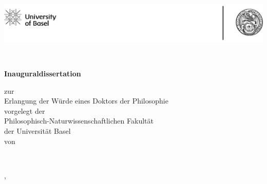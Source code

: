 
\thispagestyle{empty}
\begin{otherlanguage}{ngerman}

\begin{center}

\-\\ %
\vspace*{-2cm}
\begin{center}
\hspace*{-1cm}%
\iflogo
\includegraphics[width=\textwidth+2cm\relax]{title}%
\else
\vspace{1cm}
\fi
\hspace*{-1cm}%
\end{center}

\-\\ %
\bigskip \bigskip 

\LARGE{\textsc{\thesistitle}}

\bigskip \bigskip \bigskip \bigskip \bigskip

\normalsize{
\textbf{Inauguraldissertation} \\

\bigskip \bigskip \bigskip

zur \\
\medskip
Erlangung der Würde eines Doktors der Philosophie \\
\medskip
vorgelegt der \\
\medskip
Philosophisch-Naturwissenschaftlichen Fakultät \\
\medskip
der Universität Basel\\

\bigskip \bigskip \bigskip
von\\
\bigskip \bigskip \bigskip

\thesisauthor\\

\bigskip\bigskip
\vfill

\thesisprintingplace, \thesisyear
}




\end{center}
\end{otherlanguage}
